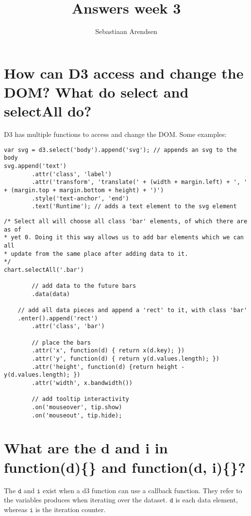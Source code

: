 \documentclass[a4paper]{scrartcl}
\title{Answers week 3}
\author{Sebastiaan Arendsen}
\begin{document}
\maketitle

\section{How can D3 access and change the DOM? What do select and selectAll do?}

D3 has multiple functions to access and change the DOM. Some examples: 

\begin{lstlisting}
var svg = d3.select('body').append('svg'); // appends an svg to the body
svg.append('text')
        .attr('class', 'label')
        .attr('transform', 'translate(' + (width + margin.left) + ', ' + (margin.top + margin.bottom + height) + ')')
        .style('text-anchor', 'end')
        .text('Runtime'); // adds a text element to the svg element
\end{lstlisting}

\begin{lstlisting}
/* Select all will choose all class 'bar' elements, of which there are as of
* yet 0. Doing it this way allows us to add bar elements which we can all 
* update from the same place after adding data to it.
*/
chart.selectAll('.bar')

        // add data to the future bars
        .data(data)

    // add all data pieces and append a 'rect' to it, with class 'bar'
    .enter().append('rect')
        .attr('class', 'bar')

        // place the bars
        .attr('x', function(d) { return x(d.key); })
        .attr('y', function(d) { return y(d.values.length); })
        .attr('height', function(d) {return height - y(d.values.length); })
        .attr('width', x.bandwidth())

        // add tooltip interactivity
        .on('mouseover', tip.show)
        .on('mouseout', tip.hide);
\end{lstlisting}

\section{What are the d and i in function(d)\{\} and function(d, i)\{\}?}
The $\mathtt{d}$ and $\mathtt{i}$ exist when a d3 function can use a callback function. They refer to the variables produces when iterating over the dataset. $\mathtt{d}$ is each data element, whereas $\mathtt{i}$ is the iteration counter.
\end{document}
